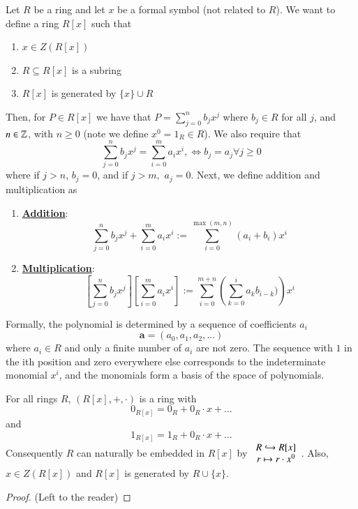 \documentclass[12pt, a4paper, oneside, openright, titlepage]{book}
\begin{document}
\begin{defn}
    Let $R$ be a ring and let $x$ be a formal symbol (not related to $R$). We want to define a ring $R[x]$ such that \begin{enumerate}
        \item $x \in Z(R[x])$
        \item $R \subseteq R[x]$ is a subring
        \item $R[x]$ is generated by $\{x\}\cup R$
    \end{enumerate}
    Then, for $P \in R[x]$ we have that $P = \sum\limits_{j=0}^nb_jx^j$ where $b_j \in R$ for all $j$, and $n \in \mathbb Z$, with $n \geq 0$ (note we define $x^0 = 1_R \in R$). We also require that \begin{equation}
        \sum\limits_{j=0}^nb_jx^j = \sum\limits_{i=0}^ma_ix^i, \iff b_j = a_j \forall j\geq 0
    \end{equation}
    where if $j > n$, $b_j = 0$, and if $j > m,$ $a_j = 0$. Next, we define addition and multiplication as 
    \begin{enumerate}
        \item[]\underline{\textbf{Addition}}: $$\sum\limits_{j=0}^nb_jx^j + \sum\limits_{i=0}^ma_ix^i := \sum\limits_{i=0}^{\max(m,n)}(a_i+b_i)x^i$$
        \item[] \underline{\textbf{Multiplication}}: $$\left[\sum\limits_{j=0}^nb_jx^j\right] \left[\sum\limits_{i=0}^ma_ix^i\right] := \sum\limits_{i=0}^{m+n}\left(\sum\limits_{k=0}^ia_{k}b_{i-k})\right)x^i$$
    \end{enumerate}
\end{defn}

\begin{rmk}
    Formally, the polynomial is determined by a sequence of coefficients $a_i$ \begin{equation}
                \mathbf{a} = (a_0,a_1,a_2,...)
        \end{equation}
    where $a_i \in R$ and only a finite number of $a_i$ are not zero. The sequence with $1$ in the ith position and zero everywhere else corresponds to the indeterminate monomial $x^i$, and the monomials form a basis of the space of polynomials.
\end{rmk}

\begin{claim}
    For all rings $R$, $(R[x], +, \cdot)$ is a ring with \begin{equation}
        0_{R[x]} = 0_R + 0_R\cdot x + ...
    \end{equation}
    and \begin{equation}
        1_{R[x]} = 1_R + 0_R\cdot x + ...
    \end{equation}
    Consequently $R$ can naturally be embedded in $R[x]$ by $\begin{array}{c} R \hookrightarrow R[x] \\ r \mapsto r\cdot x^0 \end{array}$. Also, $x \in Z(R[x])$ and $R[x]$ is generated by $R\cup \{x\}$.
    \begin{proof}
        (Left to the reader)
    \end{proof}
\end{claim}
\end{document}
